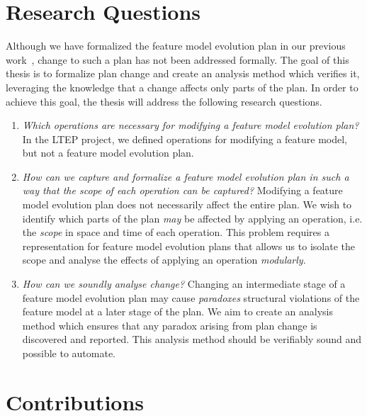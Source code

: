 \section{Research Questions}
\label{sec:research-questions}
Although we have formalized the feature model evolution plan in our previous work~\cite{art:consistency-preserving-evolution-planning}, change to such a plan has not been addressed formally. 
The goal of this thesis is to formalize plan change and create an analysis method which verifies it, leveraging the knowledge that a change affects only parts of the plan.
In order to achieve this goal, the thesis will address the following research questions.

\begin{enumerate}[\itbf{RQ\arabic*}, itemsep=0mm]
   \item \textit{Which operations are necessary for modifying a feature model evolution plan?} In the LTEP project, we defined operations for modifying a feature model, but not a feature model evolution plan. \label{rq1}
   \item \textit{How can we capture and formalize a feature model evolution plan in such a way that the scope of each operation can be captured?} Modifying a feature model evolution plan does not necessarily affect the entire plan. We wish to identify which parts of the plan \emph{may} be affected by applying an operation, i.e. the \emph{scope} in space and time of each operation. This problem requires a representation for feature model evolution plans that allows us to isolate the scope and analyse the effects of applying an operation \emph{modularly}.  \label{rq2}
   \item \textit{How can we soundly analyse change?} 
      Changing an intermediate stage of a feature model evolution plan may cause \emph{paradoxes} \textemdash{} structural violations of the feature model \textemdash{} at a later stage of the plan. 
      We aim to create an analysis method which ensures that any paradox arising from plan change is discovered and reported. This analysis method should be verifiably sound and possible to automate. \label{rq3}
\end{enumerate}

\section{Contributions}

